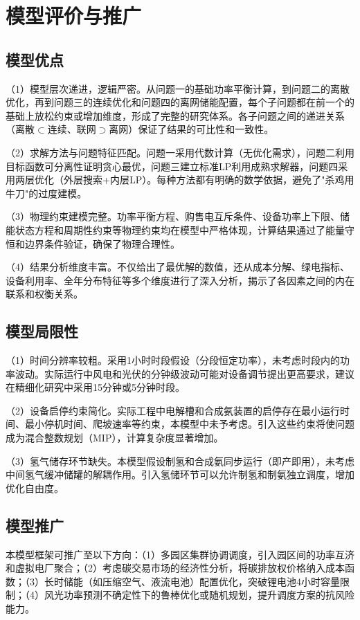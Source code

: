 \section{模型评价与推广}

\subsection{模型优点}

（1）模型层次递进，逻辑严密。从问题一的基础功率平衡计算，到问题二的离散优化，再到问题三的连续优化和问题四的离网储能配置，每个子问题都在前一个的基础上放松约束或增加维度，形成了完整的研究体系。各子问题之间的递进关系（离散$\subset$连续、联网$\supset$离网）保证了结果的可比性和一致性。

（2）求解方法与问题特征匹配。问题一采用代数计算（无优化需求），问题二利用目标函数可分离性证明贪心最优，问题三建立标准LP利用成熟求解器，问题四采用两层优化（外层搜索+内层LP）。每种方法都有明确的数学依据，避免了"杀鸡用牛刀"的过度建模。

（3）物理约束建模完整。功率平衡方程、购售电互斥条件、设备功率上下限、储能状态方程和周期性约束等物理约束均在模型中严格体现，计算结果通过了能量守恒和边界条件验证，确保了物理合理性。

（4）结果分析维度丰富。不仅给出了最优解的数值，还从成本分解、绿电指标、设备利用率、全年分布特征等多个维度进行了深入分析，揭示了各因素之间的内在联系和权衡关系。

\subsection{模型局限性}

（1）时间分辨率较粗。采用1小时时段假设（分段恒定功率），未考虑时段内的功率波动。实际运行中风电和光伏的分钟级波动可能对设备调节提出更高要求，建议在精细化研究中采用15分钟或5分钟时段。

（2）设备启停约束简化。实际工程中电解槽和合成氨装置的启停存在最小运行时间、最小停机时间、爬坡速率等约束，本模型中未予考虑。引入这些约束将使问题成为混合整数规划（MIP），计算复杂度显著增加。

（3）氢气储存环节缺失。本模型假设制氢和合成氨同步运行（即产即用），未考虑中间氢气缓冲储罐的解耦作用。引入氢储环节可以允许制氢和制氨独立调度，增加优化自由度。

\subsection{模型推广}

本模型框架可推广至以下方向：（1）多园区集群协调调度，引入园区间的功率互济和虚拟电厂聚合；（2）考虑碳交易市场的经济性分析，将碳排放权价格纳入成本函数；（3）长时储能（如压缩空气、液流电池）配置优化，突破锂电池4小时容量限制；（4）风光功率预测不确定性下的鲁棒优化或随机规划，提升调度方案的抗风险能力。
